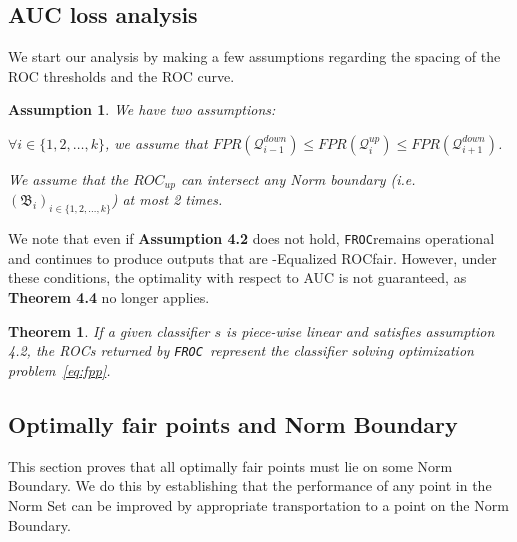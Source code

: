 \documentclass{article}
\newtheorem{theorem}{Theorem}[section]
\newtheorem{assumption}{Assumption}[section]
\newcommand{\ouralgo}{\texttt{FROC}}
\newcommand{\ourdef}{-Equalized ROC}
\begin{document}
\subsection{AUC loss analysis}
We start our analysis by making a few assumptions regarding the spacing of the ROC thresholds and the ROC curve.
\begin{assumption} \label{assumption2}
We have two assumptions:
\begin{compactitem}
    \item $\forall i\in \{1 ,2 , \hdots , k\}$, we assume that $FPR(\mathcal{Q}_{i-1}^{down}) \le FPR(\mathcal{Q}_i^{up}) \le FPR(\mathcal{Q}_{i+1}^{down})$.
    \item We assume that the $ROC_{up}$ can intersect any Norm boundary (i.e. $(\mathfrak{B}_i)_{i\in \{1 ,2 , \hdots , k\}}$) at most 2 times.
\end{compactitem}
\end{assumption}
We note that even if \textbf{Assumption 4.2} does not hold, \ouralgo remains operational and continues to produce outputs that are \ourdef fair. However, under these conditions, the optimality with respect to AUC is not guaranteed, as \textbf{Theorem 4.4} no longer applies.


\begin{theorem}
\label{thm:}If a given classifier $s$ is piece-wise linear and satisfies assumption 4.2, the ROCs returned by \ouralgo\ represent the classifier solving optimization problem~\ref{eq:fpp}.
\end{theorem}

\subsection{Optimally fair points and Norm Boundary}
This section proves that all optimally fair points must lie on some Norm Boundary. We do this by establishing that the performance of any point in the Norm Set can be improved by appropriate transportation to a point on the Norm Boundary.
\end{document}
